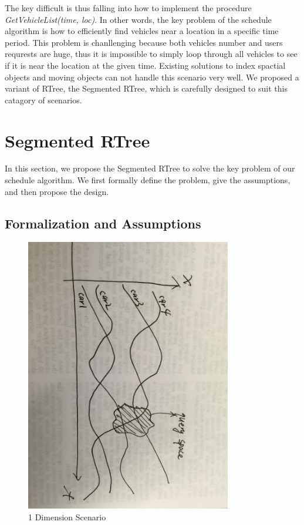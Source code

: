 \documentclass{vldb}
\begin{document}
The key difficult is thus falling into how to implement the procedure \textit{GetVehicleList(time, loc)}.
In other words, the key problem of the schedule algorithm is
how to efficiently find vehicles near a location in a specific time period.
This problem is chanllenging because both vehicles number and users requrests are huge,
thus it is impossible to simply loop through all vehicles to see if it is near the location at the given time.
Existing solutions to index spactial objects and moving objects can not handle this scenario very well.
We proposed a variant of RTree, the Segmented RTree, which is carefully designed to suit this catagory of scenarios.

\section{Segmented RTree}
\label{segmented_rtree}
In this section, we propose the Segmented RTree to solve the key problem of our schedule algorithm.
We first formally define the problem, give the assumptions, and then propose the design.
\subsection{Formalization and Assumptions}

\begin{figure}[ht!]
  \centering
  \includegraphics[width=90mm]{p1d.jpg}
  \caption{1 Dimension Scenario \label{p1d}}
\end{figure}
\end{document}
